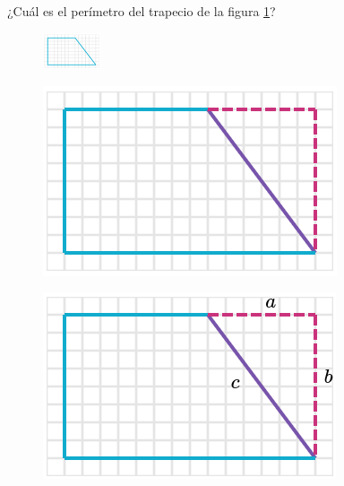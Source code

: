 
¿Cuál es el perímetro del trapecio de la figura \ref{fig:peri_trap_01}?

\begin{figure}[H]
    \centering
    \includegraphics[width=0.15\textwidth]{../images/peri_trap_01.png}
    \caption{}
    \label{fig:peri_trap_01}
\end{figure}
\begin{solutionbox}{16cm}
    \begin{minipage}{0.4\textwidth}
        \begin{figure}[H]
            \centering
            \includegraphics[width=0.5\linewidth]{../images/peri_trap_01a.png}
            \caption{}
            \label{fig:peri_trap_01a}
        \end{figure}
        \begin{figure}[H]
            \centering
            \includegraphics[width=0.5\linewidth]{../images/peri_trap_01b.png}
            \caption{}
            \label{fig:peri_trap_01b}
        \end{figure}
        \begin{figure}[H]

\end{figure}
\end{minipage}
\end{solutionbox}
